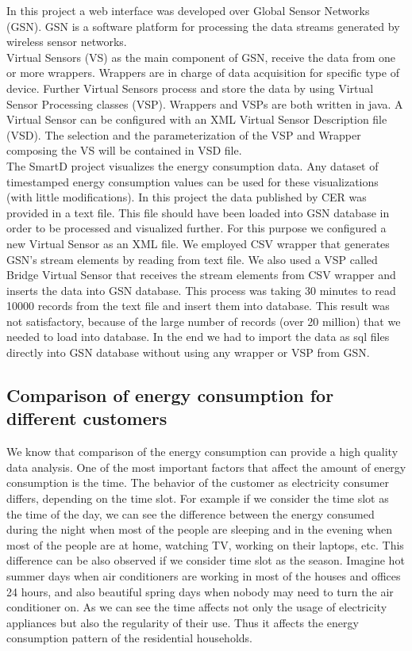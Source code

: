 \documentclass{sig-alternate-10pt}
\begin{document}
In this project a web interface was developed over Global Sensor Networks (GSN). GSN is a software platform for processing the data streams generated by wireless sensor networks.\\
 
Virtual Sensors (VS) as the main component of GSN, receive the data from one or more wrappers. Wrappers are in charge of data acquisition for specific type of device.  Further Virtual Sensors process and store the data by using Virtual Sensor Processing classes (VSP).  Wrappers and VSPs are both written in java. A Virtual Sensor can be configured with an XML Virtual Sensor Description file (VSD). The selection and the parameterization of the VSP and Wrapper composing the VS will be contained in VSD file.\cite{5}\\
 
The SmartD project visualizes the energy consumption data. Any dataset of timestamped energy consumption values can be used for these visualizations (with little modifications). In this project the data published by CER was provided in a text file. This file should have been loaded into GSN database in order to be processed and visualized further. For this purpose we configured a new Virtual Sensor as an XML file. We employed CSV wrapper that generates GSN's stream elements by reading from text file. We also used a VSP called Bridge Virtual Sensor that receives the stream elements from CSV wrapper and inserts the data into GSN database. This process was taking 30 minutes to read 10000 records from the text file and insert them into database.  This result was not satisfactory, because of the large number of records (over 20 million) that we needed to load into database. In the end we had to import the data as sql files directly into GSN database without using any wrapper or VSP from GSN.\\ 


\subsection{Comparison of energy consumption for different customers}

We know that comparison of the energy consumption can provide a high quality data analysis. One of the most important factors that affect the amount of energy consumption is the time. The behavior of the customer as electricity consumer differs, depending on the time slot. For example if we consider the time slot as the time of the day, we can see the difference between the energy consumed during the night when most of the people are sleeping and in the evening when  most of the people are at home, watching TV, working on their laptops, etc. This difference can be also observed if we consider time slot as the season. Imagine hot summer days when air conditioners are working in most of the houses and offices 24 hours, and also beautiful spring days when nobody may need to turn the air conditioner on. As we can see the time affects not only the usage of electricity appliances but also the regularity of their use. Thus it affects the energy consumption pattern of the residential households.\\ 
\end{document}
